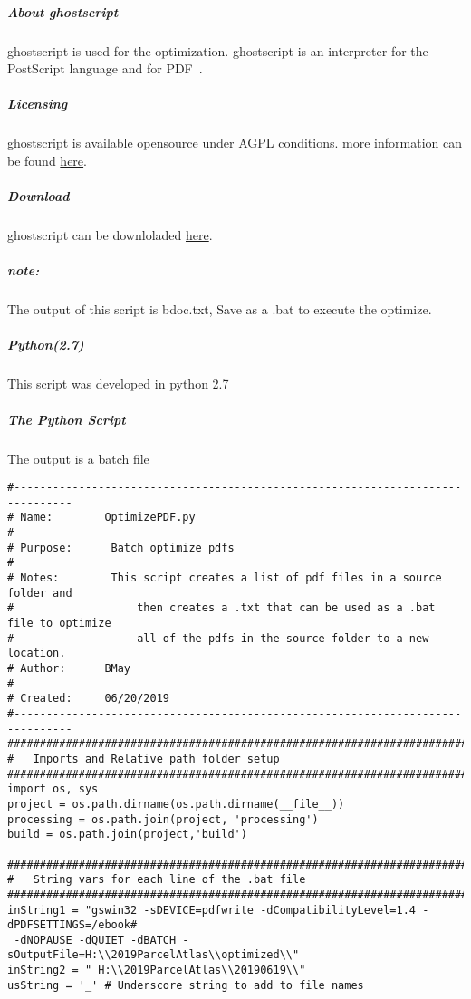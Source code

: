 \subparagraph{About ghostscript}
ghostscript is used for the optimization. ghostscript is an interpreter for the PostScript language and for PDF~\cite{ghostscript1}.
\subparagraph*{Licensing}
ghostscript is available opensource under AGPL conditions.  more information can be found \href{https://www.ghostscript.com/license.html}{here}.
\subparagraph*{Download}
ghostscript can be downloladed \href{https://www.ghostscript.com/download/gsdnld.html}{here}.

\subparagraph*{\textit{note:}} The output of this script is bdoc.txt, Save as a .bat to execute the optimize.

\subparagraph{Python(2.7)} This script was developed in python 2.7

\subparagraph{The Python Script}  The output is a batch file
{\begin{footnotesize}\color{orange}
\begin{verbatim}
#-------------------------------------------------------------------------------
# Name:        OptimizePDF.py
#
# Purpose:      Batch optimize pdfs
#
# Notes:        This script creates a list of pdf files in a source folder and
#                   then creates a .txt that can be used as a .bat file to optimize
#                   all of the pdfs in the source folder to a new location.
# Author:      BMay
#
# Created:     06/20/2019
#-------------------------------------------------------------------------------
################################################################################
#   Imports and Relative path folder setup
################################################################################
import os, sys
project = os.path.dirname(os.path.dirname(__file__))
processing = os.path.join(project, 'processing')
build = os.path.join(project,'build')

################################################################################
#   String vars for each line of the .bat file
################################################################################
inString1 = "gswin32 -sDEVICE=pdfwrite -dCompatibilityLevel=1.4 -dPDFSETTINGS=/ebook#
 -dNOPAUSE -dQUIET -dBATCH -sOutputFile=H:\\2019ParcelAtlas\\optimized\\"
inString2 = " H:\\2019ParcelAtlas\\20190619\\"
usString = '_' # Underscore string to add to file names


\end{verbatim}
\end{footnotesize}}
